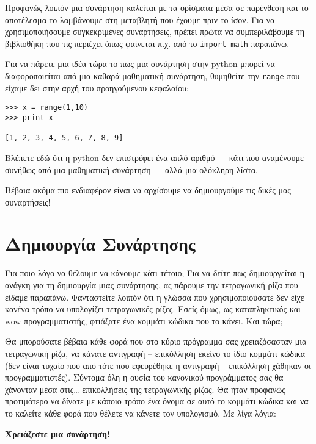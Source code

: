 Προφανώς λοιπόν μια συνάρτηση καλείται με τα ορίσματα
μέσα σε παρένθεση και το αποτέλεσμα το λαμβάνουμε στη μεταβλητή που
έχουμε πριν το ίσον.  Για να χρησιμοποιήσουμε συγκεκριμένες συναρτήσεις,
πρέπει πρώτα να συμπεριλάβουμε τη βιβλιοθήκη που τις περιέχει όπως
φαίνεται π.χ.  από το {\tt import math} παραπάνω.

Για να πάρετε μια ιδέα τώρα το πως μια συνάρτηση στην python μπορεί να
διαφοροποιείται από μια καθαρά μαθηματική συνάρτηση, θυμηθείτε την {\tt range}
που είχαμε δει στην αρχή του προηγούμενου κεφαλαίου:

\begin{verbatim}
>>> x = range(1,10)
>>> print x

[1, 2, 3, 4, 5, 6, 7, 8, 9]
\end{verbatim}

Βλέπετε εδώ ότι η python δεν επιστρέφει ένα απλό αριθμό --- κάτι που
αναμένουμε συνήθως από μια μαθηματική συνάρτηση --- αλλά μια ολόκληρη
λίστα.

Βέβαια ακόμα πιο ενδιαφέρον είναι να αρχίσουμε να δημιουργούμε τις
δικές μας συναρτήσεις!
%
\section{Δημιουργία Συνάρτησης}
%
Για ποιο λόγο να θέλουμε να κάνουμε κάτι τέτοιο; Για να δείτε πως
δημιουργείται η ανάγκη για τη δημιουργία μιας συνάρτησης, ας πάρουμε
την τετραγωνική ρίζα που είδαμε παραπάνω. Φανταστείτε λοιπόν ότι η
γλώσσα που χρησιμοποιούσατε δεν είχε κανένα τρόπο να υπολογίζει
τετραγωνικές ρίζες.  Εσείς όμως, ως καταπληκτικός και wow
προγραμματιστής, φτιάξατε ένα κομμάτι κώδικα που το κάνει. Και τώρα;

Θα μπορούσατε βέβαια κάθε φορά που στο κύριο πρόγραμμα σας
χρειαζόσασταν μια τετραγωνική ρίζα, να κάνατε αντιγραφή -- επικόλληση
εκείνο το ίδιο κομμάτι κώδικα (δεν είναι τυχαίο που από τότε που
εφευρέθηκε η αντιγραφή -- επικόλληση χάθηκαν οι προγραμματιστές).
Σύντομα όλη η ουσία του κανονικού προγράμματος σας θα χάνονταν μέσα
στις\ldots{} επικολλήσεις της τετραγωνικής ρίζας. Θα ήταν προφανώς
προτιμότερο να δίνατε με κάποιο τρόπο ένα όνομα σε αυτό το κομμάτι
κώδικα και να το καλείτε κάθε φορά που θέλετε να κάνετε τον υπολογισμό.
Με λίγα λόγια:

{\bf Χρειάζεστε μια συνάρτηση!}


